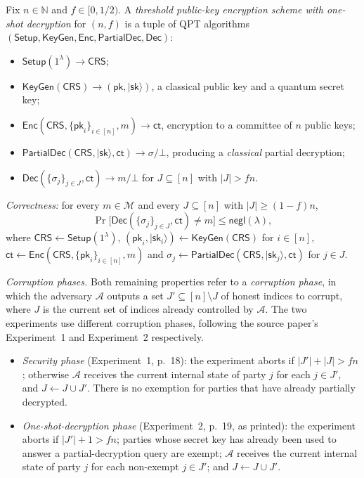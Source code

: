 \documentclass{aicr-conjecture}
\newcommand{\ket}[1]{\lvert #1 \rangle}
\newcommand{\negl}{\mathsf{negl}}
\newcommand{\Msp}{\mathcal{M}}
\newcommand{\Setup}{\mathsf{Setup}}
\newcommand{\KeyGen}{\mathsf{KeyGen}}
\newcommand{\Enc}{\mathsf{Enc}}
\newcommand{\Dec}{\mathsf{Dec}}
\newcommand{\PartialDec}{\mathsf{PartialDec}}
\newcommand{\CRS}{\mathsf{CRS}}
\newcommand{\pk}{\mathsf{pk}}
\newcommand{\sk}{\mathsf{sk}}
\newcommand{\ct}{\mathsf{ct}}
\begin{document}
\begin{definition}\label{def:tosd}
Fix $n \in \mathbb{N}$ and $f \in [0, 1/2)$. A \emph{threshold
public-key encryption scheme with one-shot decryption} for $(n, f)$ is
a tuple of QPT algorithms $(\Setup, \KeyGen, \Enc, \PartialDec,
\Dec)$:
\begin{itemize}[leftmargin=1.2em]
  \item $\Setup(1^{\lambda}) \to \CRS$;
  \item $\KeyGen(\CRS) \to (\pk, \ket{\sk})$, a classical public key
    and a quantum secret key;
  \item $\Enc(\CRS, \{\pk_{i}\}_{i \in [n]}, m) \to \ct$, encryption
    to a committee of $n$ public keys;
  \item $\PartialDec(\CRS, \ket{\sk}, \ct) \to \sigma / \bot$,
    producing a \emph{classical} partial decryption;
  \item $\Dec(\{\sigma_{j}\}_{j \in J}, \ct) \to m / \bot$ for $J
    \subseteq [n]$ with $\lvert J \rvert > f n$.
\end{itemize}

\emph{Correctness:} for every $m \in \Msp$ and every $J \subseteq [n]$
with $\lvert J \rvert \ge (1-f)n$,
\[
  \Pr\bigl[\Dec(\{\sigma_{j}\}_{j \in J}, \ct) \neq m\bigr]
    \le \negl(\lambda),
\]
where $\CRS \gets \Setup(1^{\lambda})$, $(\pk_{i}, \ket{\sk_{i}})
\gets \KeyGen(\CRS)$ for $i \in [n]$, $\ct \gets \Enc(\CRS,
\{\pk_{i}\}_{i \in [n]}, m)$ and $\sigma_{j} \gets \PartialDec(\CRS,
\ket{\sk_{j}}, \ct)$ for $j \in J$.

\emph{Corruption phases.} Both remaining properties refer to a
\emph{corruption phase}, in which the adversary $\mathcal{A}$ outputs
a set $J' \subseteq [n] \setminus J$ of honest indices to corrupt,
where $J$ is the current set of indices already controlled by
$\mathcal{A}$. The two experiments use different corruption phases,
following the source paper's Experiment~1 and Experiment~2
respectively.
\begin{itemize}[leftmargin=1.2em]
  \item \emph{Security phase} (Experiment~1, p.~18): the experiment
    aborts if $\lvert J' \rvert + \lvert J \rvert > f n$; otherwise
    $\mathcal{A}$ receives the current internal state of party $j$ for
    each $j \in J'$, and $J \gets J \cup J'$. There is no exemption
    for parties that have already partially decrypted.
  \item \emph{One-shot-decryption phase} (Experiment~2, p.~19, as
    printed): the experiment aborts if $\lvert J' \rvert + 1 > f n$;
    parties whose secret key has already been used to answer a
    partial-decryption query are exempt; $\mathcal{A}$ receives the
    current internal state of party $j$ for each non-exempt $j \in
    J'$; and $J \gets J \cup J'$.
\end{itemize}


\end{definition}
\end{document}

